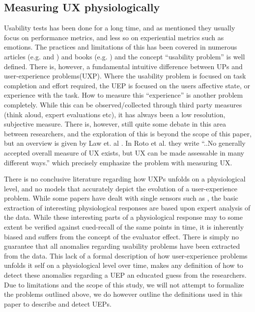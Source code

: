 \subsection{Measuring UX physiologically}
Usability tests has been done for a long time, and as mentioned they usually focus on performance metrics, and less so
on experiential metrics such as emotions. 
The practices and limitations of this has been covered in numerous articles (e.g. \cite{usability_eval} and \cite{eval_effect}) and books (e.g. \cite{guide_to_upeval}) and the concept ``usability problem'' is well defined.
There is, however, a fundamental intuitive difference between UPs and user-experience problems(UXP). 
Where the usability problem is focused on task completion and effort required, the UEP is focused on the users affective state, or experience with the task.
How to measure this ``experience'' is another problem completely.
While this can be observed/collected through third party measures (think aloud, expert evaluations etc), it has always been a low resolution, subjective measure. 
There is, however, still quite some debate in this area between researchers, and the exploration of this is beyond the scope of this paper, but an overview is given by Law et. al \cite{attitudes_ux_measure}. 
In Roto et al. \cite{what_is_ux} they write ``..No generally accepted overall measure of UX exists, but UX can be made assessable in many different ways.'' which precisely emphasize the problem with measuring UX. 

There is no conclusive literature regarding how UXPs unfolds on a physiological level, and no models that accurately depict the evolution of a user-experience problem. 
While some papers have dealt with single sensors such as \cite{mind_the_gap} \cite{LH-paper}, the basic extraction of interesting physiological responses are based upon expert analysis of the data.
While these interesting parts of a physiological response may to some extent be verified against cued-recall of the same points in time, it is inherently biased and suffers from the concept of the evaluator effect. 
There is simply no guarantee that all anomalies regarding usability problems have been extracted from the data.
This lack of a formal description of how user-experience problems unfolds it self on a physiological level over time, makes any definition of how to detect these anomalies regarding a UEP an educated guess from the researchers.
Due to limitations and the scope of this study, we will not attempt to formalize the problems outlined above, we do however outline the definitions used in this paper to describe and detect UEPs.

